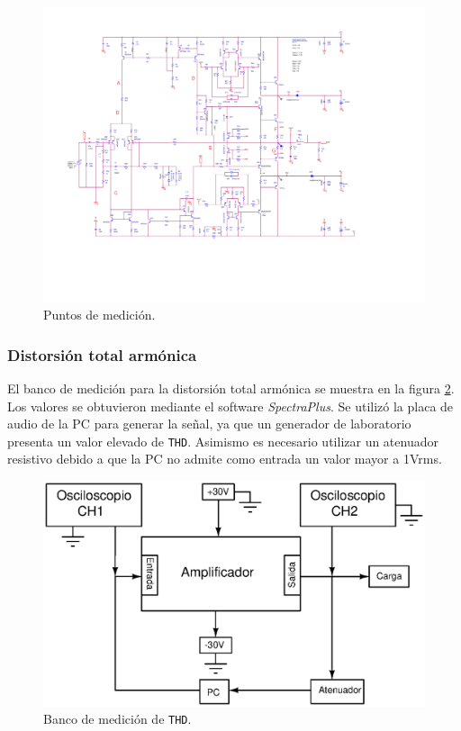 		\begin{figure}[H]
			\centering
			\includegraphics[scale=0.6]{./Figuras/esquema_puntos.pdf}
			\caption{Puntos de medición.}
			\label{fig:esq_med}
		\end{figure}

		\subsubsection{Distorsión total armónica}

		El banco de medición para la distorsión total armónica se muestra en la figura \ref{fig:thd_bco}. Los valores se obtuvieron mediante el software \textit{SpectraPlus}. Se utilizó la placa de audio de la PC para generar la señal, ya que un generador de laboratorio presenta un valor elevado de \texttt{THD}. Asimismo es necesario utilizar un atenuador resistivo debido a que la PC no admite como entrada un valor mayor a 1Vrms. 

		\begin{figure}[h!]
			\centering
			\includegraphics[scale=0.6]{./Figuras/banco_thd.eps}
			\caption{Banco de medición de \texttt{THD}.}
			\label{fig:thd_bco}
		\end{figure}

